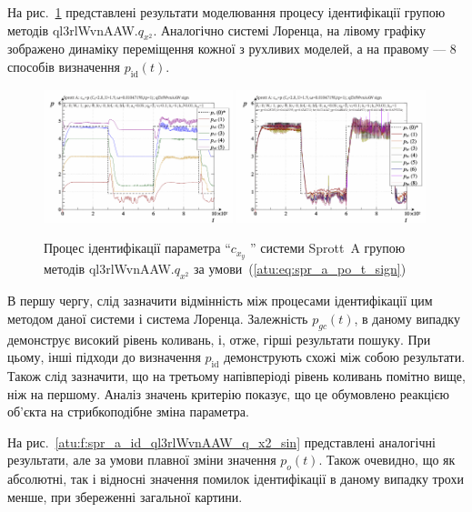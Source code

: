 На рис.~\ref{atu:f:spr_a_id_ql3rlWvnAAW_q_x2_sign}
представлені результати моделювання процесу ідентифікації групою методів ql3rlWvnAAW.$q_{x^2}$.
Аналогічно системі Лоренца, на лівому графіку зображено
динаміку переміщення кожної з рухливих моделей, а на правому ---
8 способів визначення
$ p_\mathrm{id} (t) $.

\begin{figure}[htb!]
  \centerline{
    \includegraphics[width=0.49\textwidth]{p/cha/spr_a/ql3rlWvnAAW_x2/sprott_a_id-p_t_pi_ql3rlWvnAAW_sign.png}
    \hfill
    \includegraphics[width=0.49\textwidth]{p/cha/spr_a/ql3rlWvnAAW_x2/sprott_a_id-p_t_p_ql3rlWvnAAW_sign.png}
  }
\caption{Процес ідентифікації параметра ``$ c_{x_y} $ '' системи Sprott~A групою методів ql3rlWvnAAW.$ q_{x^2} $ за умови~(\ref{atu:eq:spr_a_po_t_sign})}
  \label{atu:f:spr_a_id_ql3rlWvnAAW_q_x2_sign}
\end{figure}

В першу чергу, слід зазначити відмінність між процесами
ідентифікації цим методом даної системи і система Лоренца.
Залежність $p_{gc} (t)$, в даному випадку демонструє високий
рівень коливань, і, отже, гірші результати пошуку. При цьому, інші підходи до
визначення $p_\mathrm{id}$ демонструють схожі між собою результати.
Також слід зазначити, що на третьому напівперіоді рівень
коливань помітно вище, ніж на першому. Аналіз значень критерію
показує, що це обумовлено реакцією об'єкта на стрибкоподібне
зміна параметра.



На рис.~\ref{atu:f:spr_a_id_ql3rlWvnAAW_q_x2_sin} представлені аналогічні
результати, але за умови плавної зміни значення
$ p_o (t) $. Також очевидно, що як абсолютні, так і відносні значення
помилок ідентифікації в даному випадку трохи менше, при
збереженні загальної картини.

